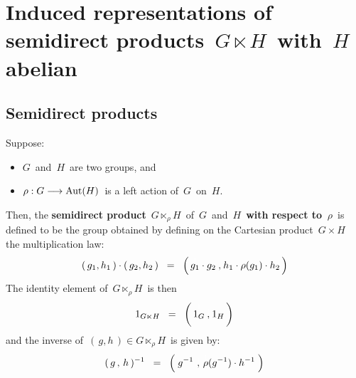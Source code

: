 

\chapter{Induced representations of semidirect products \,$G \ltimes\! H$\, with \,$H$\, abelian}
\setcounter{theorem}{0}
\setcounter{equation}{0}


\renewcommand{\theenumi}{\roman{enumi}}
\renewcommand{\labelenumi}{\textnormal{(\theenumi)}$\;\;$}


\section{Semidirect products}

\begin{definition}
\mbox{}
\vskip 0.1cm
\noindent
Suppose:
\begin{itemize}
\item
	$G$\, and \,$H$\, are two groups, and
\item
	$\rho : G \longrightarrow \textnormal{Aut}(H)$\,
	is a left action of \,$G$\, on \,$H$.\,
\end{itemize}
Then, the \textbf{semidirect product} \,$G \ltimes_{\rho}\! H$\,
of \,$G$\, and \,$H$\, \textbf{\color{red}with respect to \,$\rho$}\,
is defined to be the group
obtained by defining on the Cartesian product
\,$G \times H$\,
the multiplication law:
\begin{equation*}
(\,g_{1},h_{1}\,) \cdot (\,g_{2},h_{2}\,)
\;\; = \;\;
	\left(\,
		\overset{{\color{white}1}}{g_{1}} \cdot g_{2}
		\,\overset{{\color{white}1}}{,}\,
		h_{1} \cdot \rho(g_{1}) \cdot h_{2}
		\,\right)
\end{equation*}
The identity element of \,$G \ltimes_{\rho}\! H$\, is then
\begin{equation*}
1_{G \ltimes H}
\;\; = \;\;
	\left(\,
		\overset{{\color{white}1}}{1_{G}}
		\,\overset{{\color{white}1}}{,}\,
		1_{H}
		\,\right)
\end{equation*}
and the inverse of \,$(\,g,h\,) \in G \ltimes_{\rho}\! H$\, is given by:
\begin{equation*}
(\, g \,,\, h \,)^{-1}
\;\; = \;\;
	\left(\;
		g^{-1}
		\;\overset{{\color{white}1}}{,}\;
		\overset{{\color{white}1}}{\rho}(g^{-1}) \cdot h^{-1}
		\;\right)
\end{equation*}
\end{definition}

